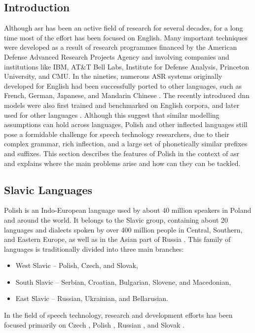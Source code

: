 \subsection{Introduction}
Although \gls{asr} has been an active field of research for several decades, for a long time most of the effort has been focused on English.  Many important techniques were developed as a result of research programmes financed by the American Defense Advanced Research Projects Agency and involving companies and institutions like IBM, AT\&T Bell Labs, Institute for Defense Analysis, Princeton University, and CMU. In the nineties, numerous ASR systems originally developed for English had been successfully ported to other languages, such as French, German, Japanese, and Mandarin Chinese \cite{besacier2014automatic}. The recently introduced \gls{dnn} models were also first trained and benchmarked on English corpora, and later used for other languages \cite{hinton2012deep}. Although this suggest that similar modelling assumptions can hold across languages, Polish and other inflected languages still pose a formidable challenge for speech technology researchers, due to their complex grammar, rich inflection, and a large set of phonetically similar prefixes and suffixes. This section describes the features of Polish in the context of \gls{asr} and explains where the main problems arise and how can they can be tackled.
\subsection{Slavic Languages}
Polish is an Indo-European language used by about 40 million speakers in Poland and around the world. It belongs to the Slavic group, containing about 20 languages and dialects spoken by over 400 million people in Central, Southern, and Eastern Europe, as well as in the Asian part of Russia \cite{karpov2012speech}. This family of languages is traditionally divided into three main branches:
\begin{itemize}
\item West Slavic -- Polish, Czech, and Slovak,
\item South Slavic -- Serbian, Croatian, Bulgarian, Slovene, and Macedonian,
\item East Slavic -- Russian, Ukrainian, and Bellarusian.
\end{itemize}
In the field of speech technology, research and development efforts has been focused primarily on Czech \cite{nouza2010adapting, oparin2008morphological}, Polish \cite{zelasko2015linguistically, ziolko2011automatic}, Russian {\cite{karpov2012speech}}, and Slovak \cite{lojka2009finite}.
